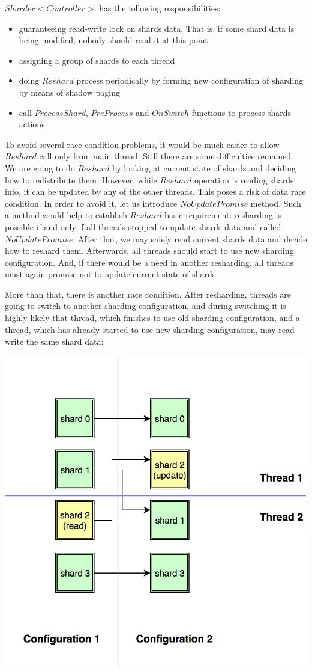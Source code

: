 \documentclass{article}
\begin{document}
$Sharder<Controller>$ has the following responsibilities:
\begin{itemize}
	\item guaranteeing read-write lock on shards data. That is, if some shard data is being modified, nobody should read it at this point
	\item assigning a group of shards to each thread
	\item doing $Reshard$ process periodically by forming new configuration of sharding by means of shadow paging
	\item call $ProcessShard$, $PreProcess$ and $OnSwitch$ functions to process shards actions
\end{itemize}

To avoid several race condition problems, it would be much easier to allow $Reshard$ call only from main thread. Still there are some difficulties remained. We are going to do $Reshard$ by looking at current state of shards and deciding how to redistribute them. However, while $Reshard$ operation is reading shards info, it can be updated by any of the other threads. This poses a risk of data race condition. In order to avoid it, let us introduce $NoUpdatePromise$ method. Such a method would help to establish $Reshard$ basic requirement: resharding is possible if and only if all threads stopped to update shards data and called $NoUpdatePromise$. After that, we may safely read current shards data and decide how to reshard them. Afterwards, all threads should start to use new sharding configuration. And, if there would be a need in another resharding, all threads must again promise not to update current state of shards.

More than that, there is another race condition. After resharding, threads are going to switch to another sharding configuration, and during switching it is highly likely that thread, which finishes to use old sharding configuration, and a thread, which has already started to use new sharding configuration, may read-write the same shard data:

\begin{center}\includegraphics[width=0.5 \textwidth]{image6.png}\end{center}
\end{document}
